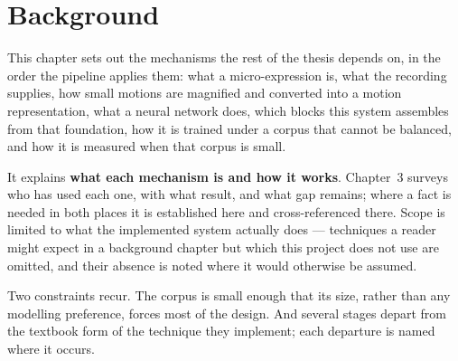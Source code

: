 %
%

\chapter{Background}
\label{ch:background}

This chapter sets out the mechanisms the rest of the thesis depends on, in the order the pipeline applies them: what a micro-expression is, what the recording supplies, how small motions are magnified and converted into a motion representation, what a neural network does, which blocks this system assembles from that foundation, how it is trained under a corpus that cannot be balanced, and how it is measured when that corpus is small.

It explains \textbf{what each mechanism is and how it works}. Chapter~3 surveys who has used each one, with what result, and what gap remains; where a fact is needed in both places it is established here and cross-referenced there. Scope is limited to what the implemented system actually does --- techniques a reader might expect in a background chapter but which this project does not use are omitted, and their absence is noted where it would otherwise be assumed.

Two constraints recur. The corpus is small enough that its size, rather than any modelling preference, forces most of the design. And several stages depart from the textbook form of the technique they implement; each departure is named where it occurs.



